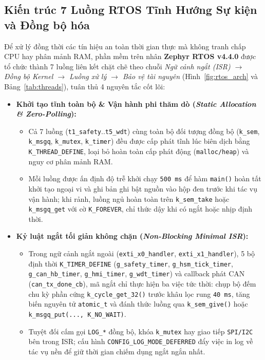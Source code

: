 \subsection{Kiến trúc 7 Luồng RTOS Tĩnh Hướng Sự kiện và Đồng bộ hóa}
Để xử lý đồng thời các tín hiệu an toàn thời gian thực mà không tranh chấp CPU hay phân mảnh RAM, phần mềm trên nhân \textbf{Zephyr RTOS v4.4.0} được tổ chức thành 7 luồng liên kết chặt chẽ theo chuỗi \textit{Ngữ cảnh ngắt (ISR) $\rightarrow$ Đồng bộ Kernel $\rightarrow$ Luồng xử lý $\rightarrow$ Bảo vệ tài nguyên} (Hình~\ref{fig:rtos_arch} và Bảng~\ref{tab:threads}), tuân thủ 4 nguyên tắc cốt lõi:
\begin{itemize}[nosep]
    \item \textbf{Khởi tạo tĩnh toàn bộ \& Vận hành phi thăm dò (\textit{Static Allocation \& Zero-Polling}):}
    \begin{itemize}[nosep]
        \item Cả 7 luồng (\texttt{t1\_safety}..\texttt{t5\_wdt}) cùng toàn bộ đối tượng đồng bộ (\texttt{k\_sem}, \texttt{k\_msgq}, \texttt{k\_mutex}, \texttt{k\_timer}) đều được cấp phát tĩnh lúc biên dịch bằng \texttt{K\_THREAD\_DEFINE}, loại bỏ hoàn toàn cấp phát động (\texttt{malloc/heap}) và nguy cơ phân mảnh RAM.
        \item Mỗi luồng được ấn định độ trễ khởi chạy \texttt{500~ms} để hàm \texttt{main()} hoàn tất khởi tạo ngoại vi và ghi bản ghi bật nguồn vào hộp đen trước khi tác vụ vận hành; khi rảnh, luồng ngủ hoàn toàn trên \texttt{k\_sem\_take} hoặc \texttt{k\_msgq\_get} với cờ \texttt{K\_FOREVER}, chỉ thức dậy khi có ngắt hoặc nhịp định thời.
    \end{itemize}
    \item \textbf{Kỷ luật ngắt tối giản không chặn (\textit{Non-Blocking Minimal ISR}):}
    \begin{itemize}[nosep]
        \item Trong ngữ cảnh ngắt ngoài (\texttt{exti\_x0\_handler}, \texttt{exti\_x1\_handler}), 5 bộ định thời \texttt{K\_TIMER\_DEFINE} (\texttt{g\_safety\_timer}, \texttt{g\_hsm\_tick\_timer}, \texttt{g\_can\_hb\_timer}, \texttt{g\_hmi\_timer}, \texttt{g\_wdt\_timer}) và callback phát CAN (\texttt{can\_tx\_done\_cb}), mã ngắt chỉ thực hiện ba việc tức thời: chụp bộ đếm chu kỳ phần cứng \texttt{k\_cycle\_get\_32()} trước khâu lọc rung \texttt{40~ms}, tăng biến nguyên tử \texttt{atomic\_t} và đánh thức luồng qua \texttt{k\_sem\_give()} hoặc \texttt{k\_msgq\_put(..., K\_NO\_WAIT)}.
        \item Tuyệt đối cấm gọi \texttt{LOG\_*} đồng bộ, khóa \texttt{k\_mutex} hay giao tiếp \texttt{SPI/I2C} bên trong ISR; cấu hình \texttt{CONFIG\_LOG\_MODE\_DEFERRED} đẩy việc in log về tác vụ nền để giữ thời gian chiếm dụng ngắt ngắn nhất.

\end{itemize}
\end{itemize}
